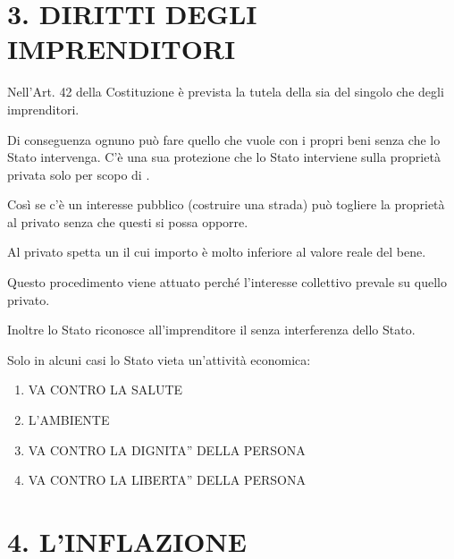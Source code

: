 \documentclass[letterpaper,10pt,italian]{sphinxmanual}
\begin{document}
\sphinxstepscope


\chapter{3. DIRITTI DEGLI IMPRENDITORI}
\label{\detokenize{3.DIRITTI DEGLI IMPRENDITORI:diritti-degli-imprenditori}}\label{\detokenize{3.DIRITTI DEGLI IMPRENDITORI::doc}}
\sphinxAtStartPar
Nell’Art. 42 della Costituzione è prevista la tutela della  sia del singolo
che degli imprenditori.

\sphinxAtStartPar
Di conseguenza ognuno può fare quello che vuole con i propri beni senza che lo Stato intervenga.
C’è una sua protezione che lo Stato interviene sulla proprietà privata solo per scopo di
.

\sphinxAtStartPar
Così se c’è un interesse pubblico (costruire una strada) può togliere la proprietà al privato senza
che questi si possa opporre.

\sphinxAtStartPar
Al privato spetta un  il cui importo è molto inferiore al valore reale del bene.

\sphinxAtStartPar
Questo procedimento viene attuato perché l’interesse collettivo prevale su quello privato.

\sphinxAtStartPar
Inoltre lo Stato riconosce all’imprenditore il 
senza interferenza dello Stato.

\sphinxAtStartPar
Solo in alcuni casi lo Stato vieta un’attività economica:
\begin{enumerate}
%
\item {} 
\sphinxAtStartPar
VA CONTRO LA SALUTE

\item {} 
\sphinxAtStartPar
L’AMBIENTE

\item {} 
\sphinxAtStartPar
VA CONTRO LA DIGNITA” DELLA PERSONA

\item {} 
\sphinxAtStartPar
VA CONTRO LA LIBERTA” DELLA PERSONA

\end{enumerate}

\sphinxstepscope


\chapter{4. L’INFLAZIONE}
\label{\detokenize{4.L'INFLAZIONE:l-inflazione}}\label{\detokenize{4.L'INFLAZIONE::doc}}
\begin{figure}[htbp]
\centering

\noindent{}
\end{figure}
\end{document}
